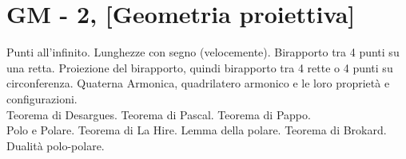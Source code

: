 \section{GM - 2, [Geometria proiettiva]}

\begin{short}
 Punti all'infinito. Lunghezze con segno (velocemente). Birapporto tra 4 punti su una retta. Proiezione del birapporto, quindi birapporto tra 4 rette o 4 punti su circonferenza. Quaterna Armonica, quadrilatero armonico e le loro proprietà e configurazioni. \\
 Teorema di Desargues. Teorema di Pascal. Teorema di Pappo. \\
 Polo e Polare. Teorema di La Hire. Lemma della polare. Teorema di Brokard.  Dualità polo-polare. 
\end{short}



